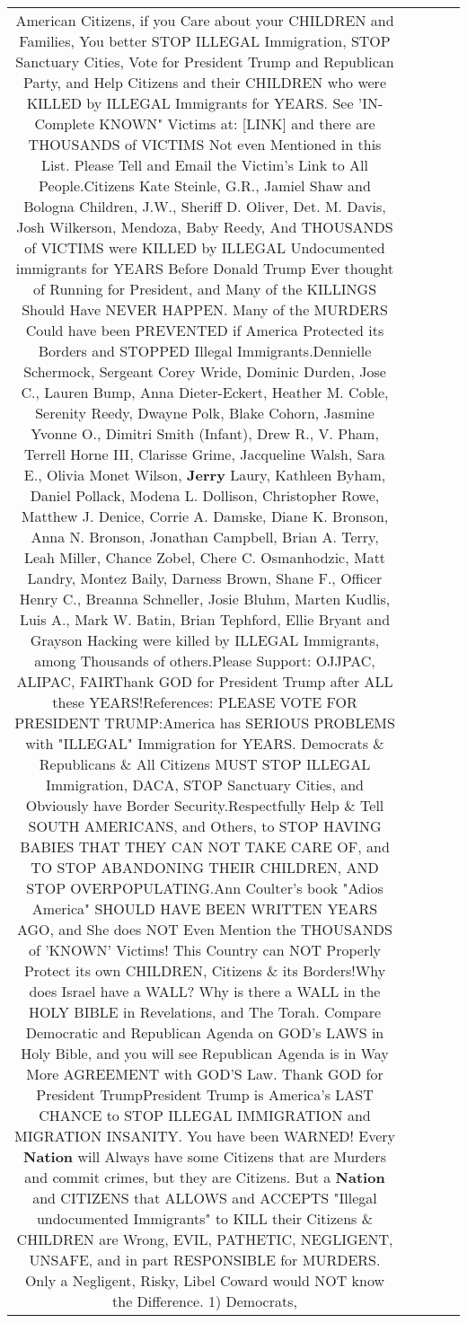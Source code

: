 \documentclass[11pt]{article}
\newlength\mylength
\begin{document}
\begin{center}
\begin{longtable}{|C{.65\mylength}|C{.30\mylength}|C{.12\mylength}|C{.12\mylength}|C{.12\mylength}|}
  \small American Citizens, if you Care about your CHILDREN and Families, You better STOP ILLEGAL Immigration, STOP Sanctuary Cities, Vote for President Trump and Republican Party, and Help Citizens and their CHILDREN who were KILLED by ILLEGAL Immigrants for YEARS. See 'IN-Complete KNOWN" Victims at:  [LINK] and there are THOUSANDS of VICTIMS Not even Mentioned in this List.   Please Tell and Email the Victim's Link to All People.Citizens Kate Steinle, G.R., Jamiel Shaw and Bologna Children, J.W., Sheriff D. Oliver, Det. M. Davis, Josh Wilkerson, Mendoza, Baby Reedy, And THOUSANDS of VICTIMS were KILLED by ILLEGAL Undocumented immigrants for YEARS Before Donald Trump Ever thought of Running for President, and Many of the KILLINGS Should Have NEVER HAPPEN. Many of the MURDERS Could have been PREVENTED if America Protected its Borders and STOPPED Illegal Immigrants.Dennielle Schermock, Sergeant Corey Wride, Dominic Durden, Jose C., Lauren Bump, Anna Dieter-Eckert, Heather M. Coble, Serenity Reedy, Dwayne Polk, Blake Cohorn, Jasmine Yvonne O., Dimitri Smith (Infant), Drew R., V. Pham, Terrell Horne III, Clarisse Grime, Jacqueline Walsh, Sara E., Olivia Monet Wilson, \textbf{Jerry} Laury, Kathleen Byham, Daniel Pollack, Modena L. Dollison, Christopher Rowe, Matthew J. Denice, Corrie A. Damske, Diane K. Bronson, Anna N. Bronson, Jonathan Campbell, Brian A. Terry, Leah Miller, Chance Zobel, Chere C. Osmanhodzic, Matt Landry, Montez Baily, Darness Brown, Shane F., Officer Henry C., Breanna Schneller, Josie Bluhm, Marten Kudlis, Luis A., Mark W. Batin, Brian Tephford, Ellie Bryant and Grayson Hacking  were killed by ILLEGAL Immigrants, among Thousands of others.Please Support: OJJPAC, ALIPAC, FAIRThank GOD for President Trump after ALL these YEARS!References: PLEASE VOTE FOR PRESIDENT TRUMP:America has SERIOUS PROBLEMS with "ILLEGAL" Immigration for YEARS. Democrats \& Republicans \& All Citizens MUST STOP ILLEGAL Immigration, DACA, STOP Sanctuary Cities, and Obviously have Border Security.Respectfully Help \& Tell SOUTH AMERICANS, and Others, to STOP HAVING BABIES THAT THEY CAN NOT TAKE CARE OF, and TO STOP ABANDONING THEIR CHILDREN, AND STOP OVERPOPULATING.Ann Coulter's book "Adios America" SHOULD HAVE BEEN WRITTEN YEARS AGO, and She does NOT Even Mention the THOUSANDS of 'KNOWN' Victims! This Country can NOT Properly Protect its own CHILDREN, Citizens \& its Borders!Why does Israel have a WALL? Why is there a WALL in the HOLY BIBLE in Revelations, and The Torah.  Compare Democratic and Republican Agenda on GOD's LAWS in Holy Bible,  and you will see Republican Agenda is in Way More AGREEMENT with GOD'S Law. Thank GOD for President TrumpPresident Trump is America's LAST CHANCE to STOP ILLEGAL IMMIGRATION and MIGRATION INSANITY. You have been WARNED! Every \textbf{Nation} will Always have some Citizens that are Murders and commit crimes, but they are Citizens. But a \textbf{Nation} and CITIZENS that ALLOWS and ACCEPTS "Illegal undocumented Immigrants" to KILL their Citizens \& CHILDREN are Wrong, EVIL, PATHETIC, NEGLIGENT, UNSAFE, and in part RESPONSIBLE for MURDERS. Only a Negligent, Risky, Libel Coward would NOT know the Difference. 1) Democrats, 
\end{longtable}
\end{center}
\end{document}
